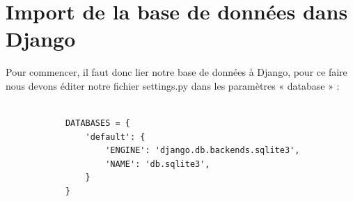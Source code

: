 \documentclass{report}
\begin{document}
        \newpage
        \section{Import de la base de données dans Django}
        Pour commencer, il faut donc lier notre base de données à Django, pour ce faire nous devons éditer notre fichier settings.py dans les paramètres « database » : 
        \begin{lstlisting}

            DATABASES = {
                'default': {
                    'ENGINE': 'django.db.backends.sqlite3',
                    'NAME': 'db.sqlite3',
                }
            }
            
        \end{lstlisting}
\end{document}
